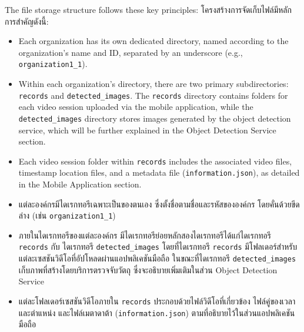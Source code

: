 \ifenglish
The file storage structure follows these key principles:
\else
โครงสร้างการจัดเก็บไฟล์มีหลักการสำคัญดังนี้:
\fi
\ifenglish
\begin{itemize}
    \item Each organization has its own dedicated directory, named according to the organization's name and ID, separated by an underscore (e.g., \texttt{organization1\_1}).
    \item Within each organization's directory, there are two primary subdirectories: \texttt{records} and \texttt{detected\_images}. The \texttt{records} directory contains folders for each video session uploaded via the mobile application, while the \texttt{detected\_images} directory stores images generated by the object detection service, which will be further explained in the Object Detection Service section.
    \item Each video session folder within \texttt{records} includes the associated video files, timestamp location files, and a metadata file (\texttt{information.json}), as detailed in the Mobile Application section.
\end{itemize}
\else
\begin{itemize}
    \item แต่ละองค์กรมีไดเรกทอรีเฉพาะเป็นของตนเอง ซึ่งตั้งชื่อตามชื่อและรหัสขององค์กร โดยคั่นด้วยขีดล่าง (เช่น \texttt{organization1\_1})
    \item ภายในไดเรกทอรีของแต่ละองค์กร มีไดเรกทอรีย่อยหลักสองไดเรกทอรีได้แก่ไดเรกทอรี \texttt{records} กับ ไดเรกทอรี \texttt{detected\_images} โดยที่ไดเรกทอรี \texttt{records} มีโฟลเดอร์สำหรับแต่ละเซสชันวิดีโอที่อัปโหลดผ่านแอปพลิเคชันมือถือ ในขณะที่ไดเรกทอรี \texttt{detected\_images} เก็บภาพที่สร้างโดยบริการตรวจจับวัตถุ ซึ่งจะอธิบายเพิ่มเติมในส่วน Object Detection Service
    \item แต่ละโฟลเดอร์เซสชันวิดีโอภายใน \texttt{records} ประกอบด้วยไฟล์วิดีโอที่เกี่ยวข้อง ไฟล์คู่ของเวลาและตำแหน่ง และไฟล์เมตาดาต้า (\texttt{information.json}) ตามที่อธิบายไว้ในส่วนแอปพลิเคชันมือถือ
\end{itemize}
\fi
